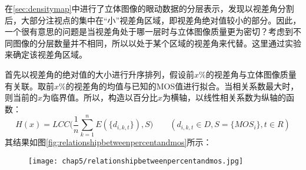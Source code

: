 在\ref{sec:densitymap}中进行了立体图像的眼动数据的分层表示，发现以视差角分割后，大部分注视点的集中在“小”视差角区域，即视差角绝对值较小的部分。因此，一个很有意思的问题是当视差角处于哪一层时与立体图像质量更为密切？考虑到不同图像的分层数量并不相同，所以以处于某个区域的视差角来代替。这里通过实验来确定该视差角区域。

首先以视差角的绝对值的大小进行升序排列，假设前$x\%$的视差角与立体图像质量有关联。取前$x\%$的视差角的均值与已知的MOS值进行拟合。当相关系数最大时，则当前的$x$为临界值。所以，构造以百分比$x$为横轴，以线性相关系数为纵轴的函数：
\begin{equation}
H(x) = LCC(\frac{1}{n}\sum\limits_{k = 1}^n {E(\{ {d_{i,k,t}}\} ),S)\qquad({d_{i,k,t}} \in D,S = \{ MO{S_i}\},t \in R )} 
\end{equation}
其结果如图\ref{fig:relationshipbetweenpercentandmos}所示：
\begin{figure}[!htp]
  \centering
  \texttt{[image: chap5/relationshipbetweenpercentandmos.jpg]}
\end{figure}

